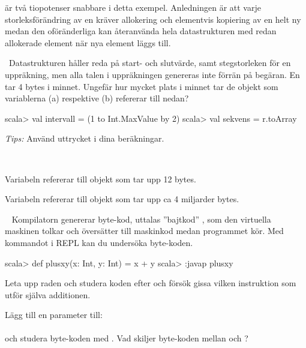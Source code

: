 \SubtaskSolved {} är två tiopotenser snabbare i detta exempel. Anledningen är att varje storleksförändring av en  kräver allokering och elementvis kopiering av en helt ny  medan den oföränderliga  kan återanvända hela datastrukturen med redan allokerade element när nya element läggs till.

\QUESTEND





\QUESTBEGIN

\Task \what~Datastrukturen  håller reda på start- och slutvärde, samt stegstorleken för en uppräkning, men alla talen i uppräkningen genereras inte förrän på begäran. En  tar 4 bytes i minnet. Ungefär hur mycket plats i minnet tar de objekt som variablerna (a)  respektive (b)  refererar till nedan?

\begin{REPL}
scala> val intervall = (1 to Int.MaxValue by 2)
scala> val sekvens = r.toArray
\end{REPL}
\emph{Tips:} Använd uttrycket  i dina beräkningar.


\SOLUTION

\TaskSolved  \what~

\SubtaskSolved Variabeln  refererar till objekt som tar upp 12 bytes.

\SubtaskSolved Variabeln  refererar till objekt som tar upp ca 4 miljarder bytes.

\QUESTEND





\QUESTBEGIN

\Task  \what~  Kompilatorn genererar byte-kod, uttalas ''bajtkod'' , som den virtuella maskinen tolkar och översätter till maskinkod medan programmet kör. Med kommandot  i REPL kan du undersöka byte-koden.
\begin{REPL}
scala> def plusxy(x: Int, y: Int) = x + y
scala> :javap plusxy
\end{REPL}

\Subtask Leta upp raden  och studera koden efter  och försök gissa vilken instruktion som utför själva additionen.

\Subtask Lägg till en parameter till: \\ 
\\ och studera byte-koden med . Vad skiljer byte-koden mellan  och ?

